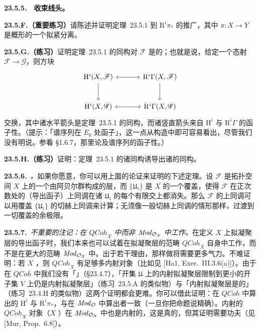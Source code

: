 \textbf{23.5.5.}\ \hard\ \textbf{收束线头。}\quad

\textbf{23.5.F.（重要练习）}\quad 请陈述并证明\mbox{定理~23.5.1} 到\trHigherPushforward{} $\mathrm{R}^i\pi_\ast$ 的推广，其中 $\pi\colon X\to Y$ 是概形的一个拟紧分离\trMorphism。

\textbf{23.5.G.（练习）}\quad 证明\mbox{定理~23.5.1} 的同构对 $\mathscr{F}$ 是\trFunctoriality{}的；也就是说，给定一个态射 $\mathscr{F}\to\mathscr{G}$，则方块
\[
\begin{tikzcd}[row sep=2.4em, column sep=3.4em]
\mathrm{H}^i(X,\mathscr{F}) \ar[d] & \mathrm{R}^i\Gamma(X,\mathscr{F}) \ar[l, <->] \ar[d] \\
\mathrm{H}^i(X,\mathscr{G}) & \mathrm{R}^i\Gamma(X,\mathscr{G}) \ar[l, <->]
\end{tikzcd}
\]
交换，其中诸水平箭头是\mbox{定理~23.5.1} 的同构，而诸竖直箭头来自 $\mathrm{H}^i$ 与 $\mathrm{R}^i\Gamma$ 的函子性。（提示：「谱序列在 $E_0$ 处函子」，这一点从构造中即可容易看出，尽管我们没有明说。参看 \S1.6.7，那里论及谱序列的函子性。）

\textbf{23.5.H.（练习）}\quad 证明：\mbox{定理~23.5.1} 的诸同构诱导出诸\trLongExactSequence{}的同构。

\textbf{23.5.6.}\ \emph{\trhRemark。}\quad 如果你愿意，你可以用上面的论证来证明\trLeray{}的下述定理。设 $\mathscr{F}$ 是拓扑空间 $X$ 上的一个由阿贝尔群构成的层，而 $\{\mathfrak{U}_i\}$ 是 $X$ 的一个覆盖，使得 $\mathscr{F}$ 在正次数处的（导出函子）上同调在诸 $\mathfrak{U}_i$ 的每个有限交上都消失。那么 $\mathscr{F}$ 的上同调可以用覆盖 $\{\mathfrak{U}_i\}$ 的切赫上同调来计算；无须像一般切赫上同调的情形那样，过渡到一切覆盖的余极限。

\textbf{23.5.7.}\ \emph{不重要的注记：在 $\mathit{QCoh}_X$ 中而非 $\mathit{Mod}_{\mathcal{O}_X}$ 中工作。}\quad 在定义 $X$ 上拟凝聚层的导出函子时，我们本来也可以试着在拟凝聚层的范畴 $\mathit{QCoh}_X$ 自身中工作，而不是在更大的范畴 $\mathit{Mod}_{\mathcal{O}_X}$ 中。出于若干理由，那样做将需要更多气力。不难证明：若 $X$ \trNoether，则 $\mathit{QCoh}_X$ 有足够多内射对象（比如见 [Ha1, Exer.~III.3.6(a)]）。由于在 $\mathit{QCoh}$ 中我们没有「\trExtensionByZero」（\S23.4.7），「开集 $\mathfrak{U}$ 上的内射拟凝聚层限制到更小的开子集 $V$ 上仍是内射拟凝聚层」（\mbox{练习~23.5.A} 的类似物）与「内射拟凝聚层是\trFlasque{}的」（\mbox{练习~23.4.H} 的类似物）这两个证明都会更难。你可以借此证明：在 $\mathit{QCoh}$ 中算出的 $\mathrm{H}^i$ 与 $\mathrm{R}^i\pi_\ast$，与在 $\mathit{Mod}_{\mathcal{O}}$ 中算出者一致（一旦你把命题说精确）。内射的 $\mathit{QCoh}_X$ 对象（$X$ \trNoether）在 $\mathit{Mod}_{\mathcal{O}_X}$ 中也是内射的，这是真的，但其证明需要功夫（见 [Mur, Prop.~6.8]）。

